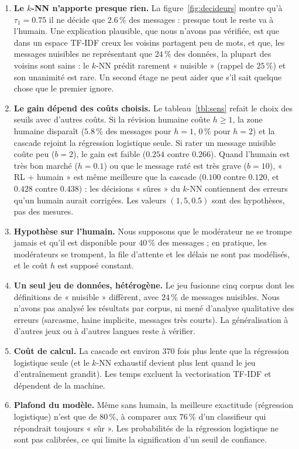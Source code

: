 \documentclass[a4paper,fleqn]{cas-sc}
\begin{document}
\begin{enumerate}
    \item \textbf{Le $k$-NN n'apporte presque rien.} La figure~\ref{fig:decideurs} montre qu'à $\tau_1=0.75$ il ne
    décide que $2.6\,\%$ des messages : presque tout le reste va à l'humain. Une explication plausible, que nous
    n'avons pas vérifiée, est que dans un espace TF-IDF creux les voisins partagent peu de mots, et que,
    les messages nuisibles ne représentant que $24\,\%$ des données, la plupart des voisins sont sains :
    le $k$-NN prédit rarement « nuisible » (rappel de $25\,\%$) et son unanimité est rare. Un second étage ne peut
    aider que s'il sait quelque chose que le premier ignore.
    \item \textbf{Le gain dépend des coûts choisis.} Le tableau~\ref{tbl:sens} refait le choix des seuils avec d'autres
    coûts. Si la révision humaine coûte $h\ge 1$, la zone humaine disparaît ($5.8\,\%$ des messages pour $h=1$, $0\,\%$
    pour $h=2$) et la cascade rejoint la régression logistique seule. Si rater un message nuisible coûte peu ($b=2$), le gain est
    faible ($0.254$ contre $0.266$). Quand l'humain est très bon marché ($h=0.1$) ou que le message raté est très
    grave ($b=10$), « RL + humain » est même meilleure que la cascade ($0.100$ contre $0.120$, et $0.428$ contre $0.438$) :
    les décisions « sûres » du $k$-NN contiennent des erreurs qu'un humain aurait corrigées. Les valeurs $(1,5,0.5)$ sont des
    hypothèses, pas des mesures.
    \item \textbf{Hypothèse sur l'humain.} Nous supposons que le modérateur ne se trompe jamais et qu'il est disponible pour
    $40\,\%$ des messages ; en pratique, les modérateurs se trompent, la file d'attente et les délais ne sont pas modélisés,
    et le coût $h$ est supposé constant.
    \item \textbf{Un seul jeu de données, hétérogène.} Le jeu fusionne cinq corpus dont les définitions de « nuisible »
    diffèrent, avec $24\,\%$ de messages nuisibles. Nous n'avons pas analysé les résultats par corpus, ni mené d'analyse
    qualitative des erreurs (sarcasme, haine implicite, messages très courts). La généralisation à d'autres jeux ou
    à d'autres langues reste à vérifier.
    \item \textbf{Coût de calcul.} La cascade est environ $370$ fois plus lente que la régression logistique seule (et le $k$-NN
    exhaustif devient plus lent quand le jeu d'entraînement grandit). Les temps excluent la vectorisation TF-IDF et dépendent
    de la machine.
    \item \textbf{Plafond du modèle.} Même sans humain, la meilleure exactitude (régression logistique) n'est que de $80\,\%$,
    à comparer aux $76\,\%$ d'un classifieur qui répondrait toujours « sûr ». Les probabilités de la régression logistique ne
    sont pas calibrées, ce qui limite la signification d'un seuil de confiance.
\end{enumerate}
\end{document}
